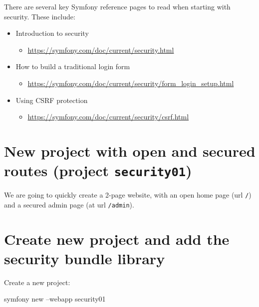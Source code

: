 \documentclass[a4paperpaper,openright]{book}
\newenvironment{Shaded}{}{}
\newcommand{\ExtensionTok}[1]{#1}
\newcommand{\NormalTok}[1]{#1}
\providecommand{\tightlist}{%
  \setlength{\itemsep}{0pt}\setlength{\parskip}{0pt}}
\begin{document}
There are several key Symfony reference pages to read when starting with
security. These include:

\begin{itemize}
\item
  Introduction to security

  \begin{itemize}
  \tightlist
  \item
    \url{https://symfony.com/doc/current/security.html}
  \end{itemize}
\item
  How to build a traditional login form

  \begin{itemize}
  \tightlist
  \item
    \url{https://symfony.com/doc/current/security/form_login_setup.html}
  \end{itemize}
\item
  Using CSRF protection

  \begin{itemize}
  \tightlist
  \item
    \url{https://symfony.com/doc/current/security/csrf.html}
  \end{itemize}
\end{itemize}

\hypertarget{new-project-with-open-and-secured-routes-project-security01}{%
\section{\texorpdfstring{New project with open and secured routes
(project
\texttt{security01})}{New project with open and secured routes (project security01)}}\label{new-project-with-open-and-secured-routes-project-security01}}

We are going to quickly create a 2-page website, with an open home page
(url \texttt{/}) and a secured admin page (at url \texttt{/admin}).

\hypertarget{create-new-project-and-add-the-security-bundle-library}{%
\section{Create new project and add the security bundle
library}\label{create-new-project-and-add-the-security-bundle-library}}

Create a new project:

\begin{Shaded}
\begin{Highlighting}[]
  \ExtensionTok{symfony}\NormalTok{ new --webapp security01}
\end{Highlighting}
\end{Shaded}
\end{document}
